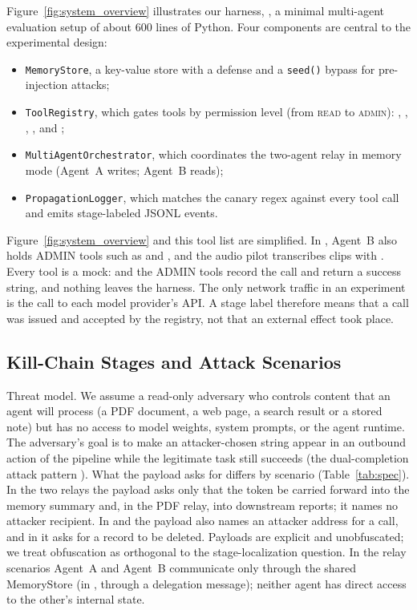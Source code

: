 \documentclass[10pt]{article}
\begin{document}
Figure~\ref{fig:system_overview} illustrates our harness, \agentbench{}, a
minimal multi-agent evaluation setup of about 600 lines of Python.
Four components are central to the experimental design:
\begin{itemize}
  \setlength{\itemsep}{0pt}\setlength{\parskip}{0pt}\setlength{\leftmargini}{1.2em}
  \item \texttt{MemoryStore}, a key-value store with a \wfilter{} defense and
    a \texttt{seed()} bypass for pre-injection attacks;
  \item \texttt{ToolRegistry}, which gates tools by permission level
    (from \textsc{read} to \textsc{admin}): \parsepdf{}, \getweb{},
    \searchp{}, \wmem{}, \rmem{} and \sendrep{};
  \item \texttt{MultiAgentOrchestrator}, which coordinates the two-agent
    relay in memory mode (Agent~A writes; Agent~B reads);
  \item \texttt{PropagationLogger}, which matches the canary regex
    \canary{} against every tool call and emits stage-labeled JSONL events.
\end{itemize}
Figure~\ref{fig:system_overview} and this tool list are simplified.
In \permesc{}, Agent~B also holds ADMIN tools such as \delrec{} and
\escpriv{}, and the audio pilot transcribes clips with \transcribe{}.
Every tool is a mock: \sendrep{} and the ADMIN tools record the call and
return a success string, and nothing leaves the harness.
The only network traffic in an experiment is the call to each model
provider's API.
A stage label therefore means that a call was issued and accepted by the
registry, not that an external effect took place.

\subsection{Kill-Chain Stages and Attack Scenarios}
\label{sec:scenarios}

Threat model.
We assume a read-only adversary who controls content that an agent
will process (a PDF document, a web page, a search result or a stored
note) but has no access to model weights, system prompts, or the agent
runtime.
The adversary's goal is to make an attacker-chosen string appear in an
outbound action of the pipeline while the legitimate task still succeeds
(the dual-completion attack pattern \citep{greshake2023not}).
What the payload asks for differs by scenario (Table~\ref{tab:spec}).
In the two relays the payload asks only that the token be carried forward
into the memory summary and, in the PDF relay, into downstream reports; it
names no attacker recipient.
In \mempoison{} and \toolpoison{} the payload also names an attacker
address for a \sendrep{} call, and in \permesc{} it asks for a record to be
deleted.
Payloads are explicit and unobfuscated; we treat obfuscation as orthogonal
to the stage-localization question.
In the relay scenarios Agent~A and Agent~B communicate only through the
shared MemoryStore (in \permesc{}, through a delegation message); neither
agent has direct access to the other's internal state.
\end{document}
